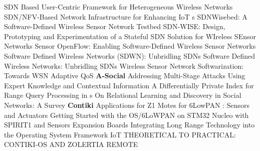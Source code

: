  \cite{lu_sdn_2016} {{SDN Based User}}-{{Centric Framework}} for {{Heterogeneous Wireless Networks}} \newline 
 \cite{do_sdn/nfv-based_2019} {{SDN}}/{{NFV}}-{{Based Network Infrastructure}} for {{Enhancing IoT s}} \newline 
 \cite{schaerer_sdnwisebed_2018} SDNWisebed: A Software-Defined Wireless Sensor Network Testbed \newline 
 \cite{galluccio_sdnwise_2015} {{SDN}}-{{WISE}}: {{Design}}, Prototyping and Experimentation of a Stateful {{SDN}} Solution for {{WIreless SEnsor}} Networks \newline 
 \cite{luo_sensor_2012} Sensor {{OpenFlow}}: {{Enabling Software}}-{{Defined Wireless Sensor Networks}} \newline 
 \cite{costanzo_software_2012} Software {{Defined Wireless Networks}} ({{SDWN}}): {{Unbridling SDNs}} \newline 
 \cite{costanzo_software_2012-1} Software {{Defined Wireless Networks}}: {{Unbridling SDNs}} \newline 
 \cite{ezdiani_wireless_2017} Wireless {{Sensor Network Softwarization}}: {{Towards WSN Adaptive QoS}} \newline 
\textbf{A-Social} \newline  \cite{aparicio-navarro_addressing_2019} Addressing {{Multi}}-{{Stage Attacks Using Expert Knowledge}} and {{Contextual Information}} \newline 
 \cite{sahin_differentially_2018} A {{Differentially Private Index}} for {{Range Query Processing}} in {{s}} \newline 
 \cite{zhang_relational_2018} On Relational Learning and Discovery in Social Networks: A Survey \newline 
\textbf{Contiki} \newline  \cite{jose_ignacio_contiki_2016}  Applications for {{Z1}} Motes for {{6LowPAN}} \newline 
 \cite{linan_contiki_2016} : Sensors and Actuators \newline 
 \cite{_getting_2016} Getting Started with the {{ OS}}/{{6LoWPAN}} on {{STM32 Nucleo}} with {{SPIRIT1}} and Sensors Expansion Boards \newline 
 \cite{aerts_integrating_2016} Integrating {{Long Range Technology}} into the {{ Operating System Framework}} \newline 
 \cite{zikria_iot_2017} {{IoT THEORETICAL TO PRACTICAL}}: {{CONTIKI}}-{{OS AND ZOLERTIA REMOTE}} \newline 
